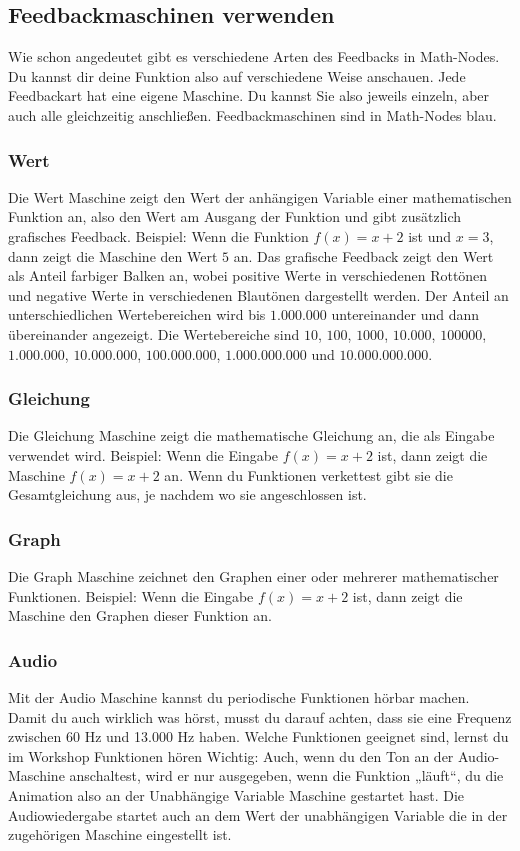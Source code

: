 \documentclass[12pt]{report}
\begin{document}
\subsection{Feedbackmaschinen verwenden}
Wie schon angedeutet gibt es verschiedene Arten des Feedbacks in Math-Nodes. Du kannst dir deine Funktion also auf verschiedene Weise anschauen. Jede Feedbackart hat eine eigene Maschine. Du kannst Sie also jeweils einzeln, aber auch alle gleichzeitig anschließen. Feedbackmaschinen sind in Math-Nodes blau.
\subsubsection{Wert}
Die Wert Maschine zeigt den Wert der anhängigen Variable einer mathematischen Funktion an, also den Wert am Ausgang der Funktion und gibt zusätzlich grafisches Feedback. 
Beispiel: Wenn die Funktion $f(x) = x + 2$ ist und $x = 3$, dann zeigt die Maschine den Wert $5$ an. 
Das grafische Feedback zeigt den Wert als Anteil farbiger Balken an, wobei positive Werte in verschiedenen Rottönen und negative Werte in verschiedenen Blautönen dargestellt werden. Der Anteil an unterschiedlichen Wertebereichen wird bis $1.000.000$ untereinander und dann übereinander angezeigt. Die Wertebereiche sind $10$, $100$, $1000$, $10.000$, $100000$, $1.000.000$, $10.000.000$, $100.000.000$, $1.000.000.000$ und $10.000.000.000$.
\subsubsection{Gleichung}
Die Gleichung Maschine zeigt die mathematische Gleichung an, die als Eingabe verwendet wird. Beispiel: Wenn die Eingabe $f(x) = x + 2$ ist, dann zeigt die Maschine $f(x) = x + 2$ an. Wenn du Funktionen verkettest gibt sie die Gesamtgleichung aus, je nachdem wo sie angeschlossen ist.
\subsubsection{Graph}
Die Graph Maschine zeichnet den Graphen einer oder mehrerer mathematischer Funktionen. Beispiel: Wenn die Eingabe $f(x) = x + 2$ ist, dann zeigt die Maschine den Graphen dieser Funktion an.
\subsubsection{Audio}
Mit der Audio Maschine kannst du periodische Funktionen hörbar machen. Damit du auch wirklich was hörst, musst du darauf achten, dass sie eine Frequenz zwischen 60 Hz und 13.000 Hz haben. Welche Funktionen geeignet sind, lernst du im Workshop Funktionen hören  
Wichtig: Auch, wenn du den Ton an der Audio-Maschine anschaltest, wird er nur ausgegeben, wenn die Funktion „läuft“, du die Animation also an der Unabhängige Variable Maschine gestartet hast. Die Audiowiedergabe startet auch an dem Wert der unabhängigen Variable die in der zugehörigen Maschine eingestellt ist.
\end{document}
